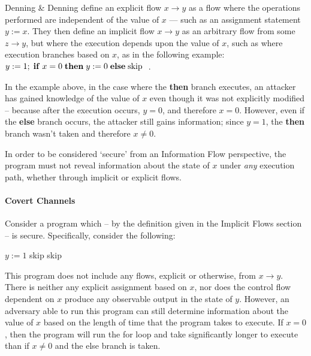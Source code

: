 	Denning \& Denning \cite{denning1977if} define an explicit flow $ x \rightarrow y$ as a flow where the operations performed are independent of the value of $ x $ --- such as an assignment statement $ y := x $. They then define an implicit flow $ x \rightarrow y$ as an arbitrary flow from some $ z \rightarrow y $, but where the execution depends upon the value of $ x $, such as where execution branches based on $ x $, as in the following example: $ y := 1; \;\text{\textbf{if}}\; x = 0 \;\text{\textbf{then}}\; y := 0 \;\text{\textbf{else}}\; \text{skip}\;$ \cite{denning1977if}.
	
	In the example above, in the case where the \textbf{then} branch executes, an attacker has gained knowledge of the value of $ x $ even though it was not explicitly modified -- because after the execution occurs, $ y = 0 $, and therefore $ x = 0 $. However, even if the \textbf{else} branch occurs, the attacker still gains information; since $ y = 1 $, the \textbf{then} branch wasn't taken and therefore $ x \ne 0 $.
	
	In order to be considered `secure' from an Information Flow perspective, the program must not reveal information about the state of $ x $ under \textit{any} execution path, whether through implicit or explicit flows.
	
	\paragraph{Covert Channels}
	
	Consider a program which -- by the definition given in the Implicit Flows section -- is secure. Specifically, consider the following: 
	
	\begin{algorithmic}
		\State $ y := 1 $
				\State skip
			\EndFor
		\Else
			\State skip
		\EndIf
	\end{algorithmic}
	
	This program does not include any flows, explicit or otherwise, from $ x \rightarrow y $. There is neither any explicit assignment based on $ x $, nor does the control flow dependent on $ x $ produce any observable output in the state of $ y $. However, an adversary able to run this program can still determine information about the value of $ x $ based on the length of time that the program takes to execute. If $ x = 0 $, then the program will run the for loop and take significantly longer to execute than if $ x \ne 0 $ and the else branch is taken.
	

